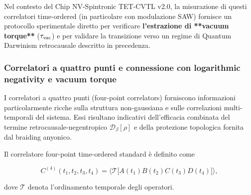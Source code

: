 \documentclass[11pt,a4paper]{article}
\theoremstyle{plain}
\theoremstyle{definition}
\begin{document}
\vspace{0.5cm}

Nel contesto del Chip NV-Spintronic TET-CVTL v2.0, la misurazione di questi correlatori time-ordered (in particolare con modulazione SAW) fornisce un protocollo sperimentale diretto per verificare \textbf{l’estrazione di **vacuum torque**} ($\tau_{\rm vac}$) e per validare la transizione verso un regime di Quantum Darwinism retrocausale descritto in precedenza.






\vspace{0.4cm}

\subsubsection{Correlatori a quattro punti e connessione con logarithmic negativity e vacuum torque}

\vspace{0.2cm}

I correlatori a quattro punti (four-point correlators) forniscono informazioni particolarmente ricche sulla struttura non-gaussiana e sulle correlazioni multi-temporali del sistema. Essi risultano indicativi dell’efficacia combinata del termine retrocausale-negentropico $\mathcal{D}_\beta[\rho]$ e della protezione topologica fornita dal braiding anyonico.


\vspace{0.3cm}

Il correlatore four-point time-ordered standard è definito come

\vspace{0.2cm}

\begin{tcolorbox}[
  colback=cyan!5!white, 
  colframe=cyan!50!black, 
  title=Correlatore four-point time-ordered standard, 
  fonttitle=\bfseries,
  breakable,
  enhanced,
  width=\textwidth,
  boxrule=0.8pt,
  arc=5pt
]
\begin{equation}
C^{(4)}(t_1,t_2,t_3,t_4) = \langle \mathcal{T} \bigl[ A(t_1) B(t_2) C(t_3) D(t_4) \bigr] \rangle,
\label{eq:four_point}
\end{equation}
\end{tcolorbox}

\vspace{0.3cm}

dove $\mathcal{T}$ denota l’ordinamento temporale degli operatori.


\vspace{0.5cm}
\end{document}
